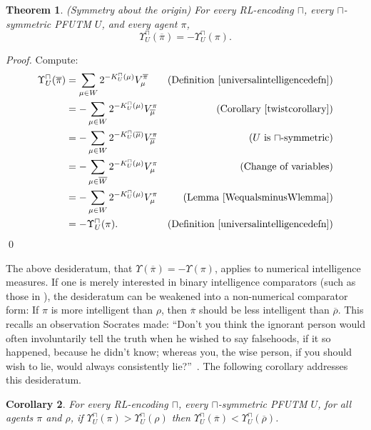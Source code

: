\documentclass[runningheads]{llncs}
\newtheorem{mytheorem}{Theorem}
\newtheorem{mycorollary}[mytheorem]{Corollary}
\def\LH{\Upsilon}
\begin{document}
\begin{mytheorem}
\label{maintheorem}
(Symmetry about the origin)
    For every RL-encoding $\sqcap$,
    every $\sqcap$-symmetric PFUTM $U$, and every agent $\pi$,
    \[
        \LH^\sqcap_U(\overline\pi) = -\LH^\sqcap_U(\pi).
    \]
\end{mytheorem}

\begin{proof}
    Compute:
    \begin{align*}
        \LH^\sqcap_U(\overline\pi) &= \sum_{\mu\in W} 2^{-K^\sqcap_U(\mu)}V^{\overline\pi}_\mu
            &\mbox{(Definition \ref{universalintelligencedefn})}\\
          &= -\sum_{\mu\in W} 2^{-K^\sqcap_U(\mu)}V^\pi_{\overline\mu}
            &\mbox{(Corollary \ref{twistcorollary})}\\
          &= -\sum_{\mu\in W} 2^{-K^\sqcap_U(\overline\mu)}V^\pi_{\overline\mu}
            &\mbox{($U$ is $\sqcap$-symmetric)}\\
          &= -\sum_{\mu\in \overline W} 2^{-K^\sqcap_U(\mu)}V^\pi_\mu
            &\mbox{(Change of variables)}\\
          &= -\sum_{\mu\in W} 2^{-K^\sqcap_U(\mu)}V^\pi_\mu
            &\mbox{(Lemma \ref{WequalsminusWlemma})}\\
          &= -\LH^\sqcap_{U}(\pi).
            &\mbox{(Definition \ref{universalintelligencedefn})}
    \end{align*}
    \qed
\end{proof}

The above desideratum, that $\Upsilon(\overline\pi)=-\Upsilon(\pi)$, applies to
numerical intelligence measures. If one is merely interested in binary
intelligence comparators (such as those in \cite{alexander2019intelligence}),
the desideratum can be weakened into a non-numerical comparator form:
    If $\pi$ is more intelligent than $\rho$,
    then $\overline\pi$ should be less intelligent than $\overline\rho$.
This recalls an observation Socrates made:
``Don't you think the ignorant person would often involuntarily
tell the truth when he wished to say falsehoods, if it so happened, because he
didn't know; whereas you, the wise person, if you should wish to lie,
would always consistently lie?''\ \cite{lesserhippias}.
The following corollary addresses this desideratum.

\begin{mycorollary}
\label{comparatorcorollary}
    For every RL-encoding $\sqcap$, every $\sqcap$-symmetric PFUTM $U$,
    for all agents $\pi$ and $\rho$, if $\LH^\sqcap_U(\pi)>\LH^\sqcap_U(\rho)$
    then $\LH^\sqcap_U(\overline\pi)<\LH^\sqcap_U(\overline\rho)$.
\end{mycorollary}
\end{document}
